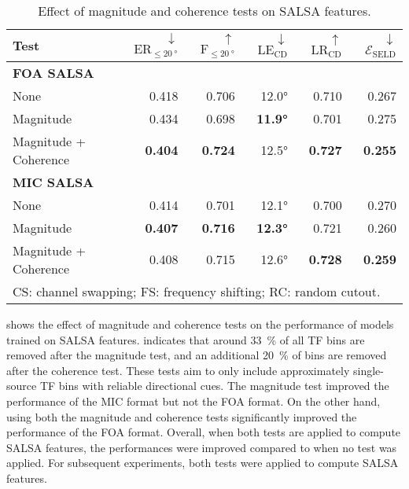 \documentclass[journal]{IEEEtran}
\begin{document}
\begin{table}[t]
    \setlength\tabcolsep{3pt}
    \centering
    \caption{Effect of magnitude and coherence tests on SALSA features.}
    \noindent\begin{tabularx}{\columnwidth}{Xrrrrr}
    \toprule 
        Test&
        $\downarrow$ $\text{ER}_{\le \SI{20}{\degree}}$ &
        $\uparrow$ $\text{F}_{\le \SI{20}{\degree}}$ &
        $\downarrow$ $\text{LE}_\text{CD}$&
        $\uparrow$ $\text{LR}_\text{CD}$ &
        $\downarrow$ $\mathcal{E}_\text{SELD}$
        \\ \midrule
       \bfseries FOA SALSA\\
        
        None    & 0.418 & 0.706 & 12.0\si{\degree} & 0.710 & 0.267\\
        Magnitude    & 0.434 & 0.698 & \bf{11.9\si{\degree}} & 0.701 & 0.275\\
        Magnitude + Coherence
                & \bf{0.404} & \bf{0.724} & 12.5\si{\degree} & \bf{0.727} & \bf{0.255}\\
        \midrule
        \bfseries MIC SALSA\\
        
        None  & 0.414 & 0.701 & 12.1\si{\degree} & 0.700 & 0.270 \\
        Magnitude    & \bf{0.407} & \bf{0.716} & \bf{12.3\si{\degree}} & 0.721 & 0.260 \\
        Magnitude + Coherence  & 0.408 & 0.715 & 12.6\si{\degree} & \bf{0.728} & \bf{0.259} \\ 
    \bottomrule
    \multicolumn{6}{l}{CS: channel swapping; FS: frequency shifting; RC: random cutout.}
    \label{tab:sp_test}
    \end{tabularx}
\end{table}

 shows the effect of magnitude and coherence tests on the performance of models trained on SALSA features.  indicates that around \SI{33}{\percent} of all TF bins are removed after the magnitude test, and an additional \SI{20}{\percent} of bins are removed after the coherence test. These tests aim to only include approximately single-source TF bins with reliable directional cues. The magnitude test improved the performance of the MIC format but not the FOA format. On the other hand, using both the magnitude and coherence tests significantly improved the performance of the FOA format. Overall, when both tests are applied to compute SALSA features, the performances were improved compared to when no test was applied. For subsequent experiments, both tests were applied to compute SALSA features. 
\end{document}

